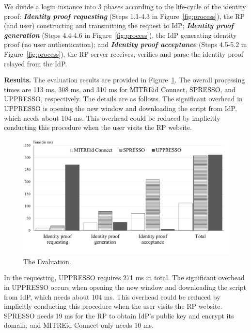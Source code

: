 We divide a login instance into 3 phases according to the life-cycle of the identity proof:
\textbf{\em Identity proof requesting} (Steps 1.1-4.3 in Figure~\ref{fig:process}), the RP (and user) constructing and transmitting the request to IdP;
\textbf{\em Identity proof generation} (Steps 4.4-4.6 in Figure~\ref{fig:process}), the IdP generating identity proof (no user authentication);
and \textbf{\em Identity proof acceptance} (Steps 4.5-5.2 in Figure~\ref{fig:process}), the RP server receives, verifies and parse the identity proof relayed from the IdP.

\noindent\textbf{Results.}
The evaluation results are provided in Figure~\ref{fig:evaluation}.
The overall processing times are  113 ms, 308 ms, and 310 ms for MITREid Connect, SPRESSO, and UPPRESSO, respectively. The details are as follows.
The significant overhead  in UPPRESSO is opening the new window and downloading the script from IdP, which needs about 104 ms. This overhead could be reduced by implicitly conducting this procedure when the user visits the RP website.


\begin{figure}
  \centering
  \includegraphics[width=0.9\linewidth]{fig/evaluation2.pdf}
  \vspace{-6mm}
  \caption{The Evaluation.}
  \label{fig:evaluation}
\vspace{-7mm}
\end{figure}

In the requesting, UPPRESSO requires 271 ms in total.
The significant overhead  in UPPRESSO occurs when opening the new window and downloading the script from IdP, which needs about 104 ms. This overhead could be reduced by implicitly conducting this procedure when the user visits the RP website.
SPRESSO needs 19 ms for the RP to obtain IdP's public key and encrypt its domain,
and MITREid Connect only needs 10 ms.



